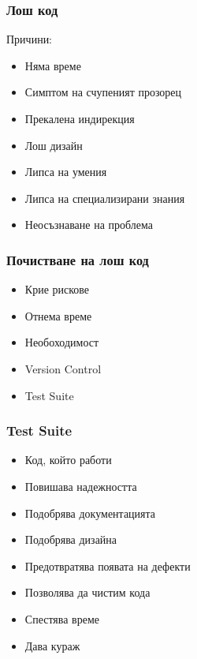 
\begin{frame}
  \frametitle{Лош код}
  Причини:
  \begin{itemize}
  \item Няма време
  \item Симптом на счупеният прозорец
  \item Прекалена индирекция
  \item Лош дизайн
  \item Липса на умения
  \item Липса на специализирани знания
  \item Неосъзнаване на проблема
  \end{itemize}
\end{frame}

\begin{frame}
  \frametitle{Почистване на лош код}
  \begin{minipage}[t]{0.48\linewidth}
    \begin{itemize}
        \item Крие рискове
        \item Отнема време
        \item Необоходимост
    \end{itemize}
  \end{minipage}\hfill
  \begin{minipage}[t]{0.48\linewidth}
      \begin{itemize}
          \item Version Control
          \item Test Suite
      \end{itemize}
  \end{minipage}
\end{frame}

\begin{frame}
  \frametitle{Test Suite}
  \begin{itemize}
    \item Код, който работи
    \item Повишава надежността 
    \item Подобрява документацията
    \item Подобрява дизайна
    \item Предотвратява появата на дефекти
    \item Позволява да чистим кода
    \item Спестява време
    \item Дава кураж
  \end{itemize}
\end{frame}
